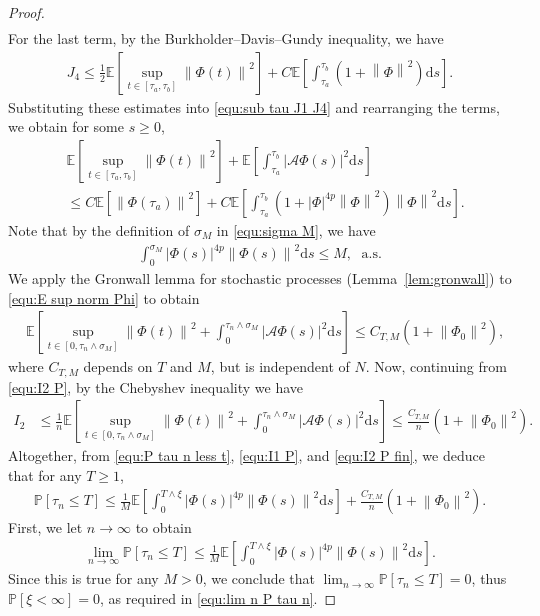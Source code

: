 \documentclass[11pt, reqno]{amsart}
\theoremstyle{definition}
\numberwithin{equation}{section}
\newcommand{\bb}{\mathbb}
\newcommand{\ds}{\mathrm{d}s}
\newcommand{\norm}[1]{\left\|{#1}\right\|}
\newcommand{\abs}[1]{\left|{#1}\right|}
\begin{document}
\begin{proof}
\begin{align*}
\end{align*}
For the last term, by the Burkholder--Davis--Gundy inequality, we have
\begin{align*}
	J_4
	\leq
	\frac12 \bb{E} \left[\sup_{t\in [\tau_a, \tau_b]} \norm{\Phi(t)}^2 \right] 
	+
	C\bb{E} \left[\int_{\tau_a}^{\tau_b} \left(1+\norm{\Phi}^2\right) \ds \right].
\end{align*}
Substituting these estimates into \eqref{equ:sub tau J1 J4} and rearranging the terms, we obtain for some $s\geq 0$,
\begin{align}\label{equ:E sup norm Phi}
	&\bb{E} \left[ \sup_{t\in [\tau_a,\tau_b]} \norm{\Phi(t)}^2 \right] 
	+
	\bb{E} \left[ \int_{\tau_a}^{\tau_b} \abs{\mathcal{A} \Phi(s)}^2 \ds \right] 
	\nonumber\\
	&\leq
	C \bb{E} \left[\norm{\Phi(\tau_a)}^2\right] 
	+
	C \bb{E} \left[ \int_{\tau_a}^{\tau_b} \left(1+\abs{\Phi}^{4p} \norm{\Phi}^2 \right) \norm{\Phi}^2 \ds \right].
\end{align}
Note that by the definition of $\sigma_M$ in \eqref{equ:sigma M}, we have
\begin{align*}
	\int_0^{\sigma_M} \abs{\Phi(s)}^{4p} \norm{\Phi(s)}^2 \ds \leq M, \; \text{ a.s.}
\end{align*}
We apply the Gronwall lemma for stochastic processes (Lemma~\ref{lem:gronwall}) to \eqref{equ:E sup norm Phi} to obtain
\begin{align*}
	&\bb{E} \left[ \sup_{t\in [0,\tau_n\wedge\sigma_M]} \norm{\Phi(t)}^2 + \int_0^{\tau_n \wedge\sigma_M} \abs{\mathcal{A} \Phi(s)}^2 \ds \right] 
	\leq
	C_{T,M} \left(1+ \norm{\Phi_0}^2 \right),
\end{align*}
where $C_{T,M}$ depends on $T$ and $M$, but is independent of $N$. Now, continuing from \eqref{equ:I2 P}, by the Chebyshev inequality we have
\begin{align}\label{equ:I2 P fin}
	I_2
	&\leq
	\frac{1}{n}  \bb{E} \left[ \sup_{t\in [0,\tau_n\wedge\sigma_M]} \norm{\Phi(t)}^2 + \int_0^{\tau_n \wedge\sigma_M} \abs{\mathcal{A} \Phi(s)}^2 \ds \right]
	\leq
	\frac{C_{T,M}}{n} \left(1+ \norm{\Phi_0}^2 \right).
\end{align}
Altogether, from \eqref{equ:P tau n less t}, \eqref{equ:I1 P}, and \eqref{equ:I2 P fin}, we deduce that for any $T\geq 1$,
\begin{align*}
	\bb{P}\left[\tau_n \leq T\right] \leq \frac{1}{M} \bb{E} \left[\int_0^{T\wedge\xi} \abs{\Phi(s)}^{4p} \norm{\Phi(s)}^2 \ds \right]
	+
	\frac{C_{T,M}}{n} \left(1+ \norm{\Phi_0}^2 \right).
\end{align*}
First, we let $n\to\infty$ to obtain
\begin{align*}
	\lim_{n\to\infty} \bb{P}\left[\tau_n \leq T\right] \leq \frac{1}{M} \bb{E} \left[\int_0^{T\wedge\xi} \abs{\Phi(s)}^{4p} \norm{\Phi(s)}^2 \ds \right].
\end{align*}
Since this is true for any $M>0$, we conclude that $\lim_{n\to\infty} \bb{P}\left[\tau_n \leq T\right]=0$, thus $\bb{P}\left[\xi< \infty\right]=0$, as required in \eqref{equ:lim n P tau n}.
\end{proof}
\end{document}
